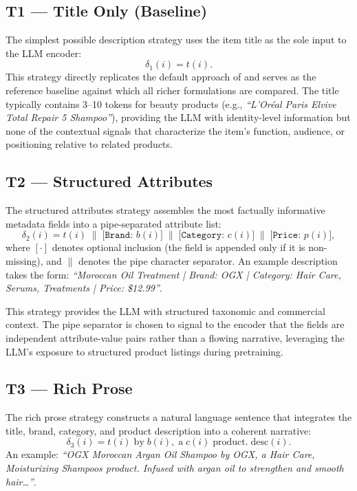 \documentclass[12pt,a4paper]{report}
\newcommand{\textcite}[1]{\citet{#1}}
\begin{document}
\subsection{T1 --- Title Only (Baseline)}

The simplest possible description strategy uses the item title
as the sole input to the LLM encoder:
\begin{equation}
  \delta_1(i) = t(i).
\end{equation}
This strategy directly replicates the default approach of
\textcite{boz2025improving} and serves as the reference
baseline against which all richer formulations are compared.
The title typically contains 3--10 tokens for beauty products
(e.g., \textit{``L'Or\'eal Paris Elvive Total Repair 5 Shampoo''}),
providing the LLM with identity-level information but none of
the contextual signals that characterize the item's function,
audience, or positioning relative to related products.

\subsection{T2 --- Structured Attributes}

The structured attributes strategy assembles the most factually
informative metadata fields into a pipe-separated attribute list:
\begin{equation}
  \delta_2(i) = t(i)
    \;\|\; \bigl[ \texttt{Brand: } b(i) \bigr]
    \;\|\; \bigl[ \texttt{Category: } c(i) \bigr]
    \;\|\; \bigl[ \texttt{Price: } p(i) \bigr],
\end{equation}
where $[\cdot]$ denotes optional inclusion (the field is
appended only if it is non-missing), and $\|$ denotes the
pipe character separator. An example description takes
the form: \textit{``Moroccan Oil Treatment | Brand: OGX
| Category: Hair Care, Serums, Treatments | Price: \$12.99''}.

This strategy provides the LLM with structured taxonomic
and commercial context. The pipe separator is chosen to
signal to the encoder that the fields are independent
attribute-value pairs rather than a flowing narrative,
leveraging the LLM's exposure to structured product listings
during pretraining.

\subsection{T3 --- Rich Prose}

The rich prose strategy constructs a natural language sentence
that integrates the title, brand, category, and product
description into a coherent narrative:
\begin{equation}
  \delta_3(i) =
    t(i)
    \;\text{by}\; b(i) \mathbf{,}
    \;\text{a}\; c(i) \;\text{product.}\;
    \text{desc}(i).
\end{equation}
An example: \textit{``OGX Moroccan Argan Oil Shampoo by OGX,
a Hair Care, Moisturizing Shampoos product. Infused with argan
oil to strengthen and smooth hair\ldots''}.
\end{document}
